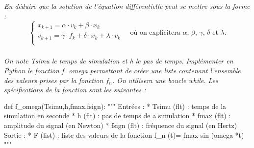 \documentclass[10pt]{article}
\newif\ifprof
\begin{document}
\subparagraph{}
\textit{En déduire que la solution de l'équation différentielle peut se mettre sous la forme :
$$
\left\{
\begin{array}{l}
x_{k+1} = \alpha \cdot v_k + \beta \cdot x_k \\
v_{k+1} = \gamma \cdot f_k + \delta  \cdot x_k  + \lambda\cdot v_k \\
\end{array}
\right.
\quad \text{où on explicitera $\alpha$, $\beta$, $\gamma$, $\delta$ et $\lambda$.}
$$
}

\ifprof
\begin{corrige}
Dans ses conditions, on a : 
$$
\alpha  = h \quad \beta = 1 \quad \gamma =\dfrac{h}{m} \quad \delta = -\dfrac{kh}{m} \quad \lambda = \dfrac{1-ch}{m}
$$
\end{corrige}
\else
\fi




\subparagraph{}
\textit{On note \textsf{Tsimu} le temps de simulation et \textsf{h} le pas de temps. Implémenter en Python le fonction \textsf{f\_omega} 
permettant de créer une liste contenant l'ensemble des valeurs prises par la fonction $f_n$. On utilisera une boucle \textsf{while}. Les spécifications de la fonction sont les suivantes : }

\begin{py}
\begin{python}
def f_omega(Tsimu,h,fmax,fsign):
   """
   Entrées :
       * Tsimu (flt) : temps de la simulation en seconde
       * h (flt) : pas de temps de a simulation
       * fmax (flt) : amplitude du signal (en Newton)
       * fsign (flt) : fréquence du signal (en Hertz)
   Sortie : 
       * F (list) : liste des valeurs de la fonction 
          f_n (t)= fmax sin (omega *t)
   """
\end{python}
\end{py}

\ifprof
\begin{corrige}
\begin{py}
\begin{python}
def f_omega(Tsimu,h,fmax,fsign):
   """
   Entrées :
       * Tsimu (flt) : temps de la simulation en seconde
       * h (flt) : pas de temps de a simulation
       * fmax (flt) : amplitude du signal (en Newton)
       * fsign (flt) : fréquence du signal (en Hertz)
   Sortie : 
       * F (list) : liste des valeurs de la fonction 
          f_n (t)= fmax sin (omega *t)
   """
    omega  = 2*math.pi*fsign
    t=0 
    F = []
    while t<Tsimu :
        F.append(fmax*math.sin(omega*t))
        t=t+h
    return F
    
\end{python}
\end{py}

\end{corrige}
\else
\fi
\end{document}
